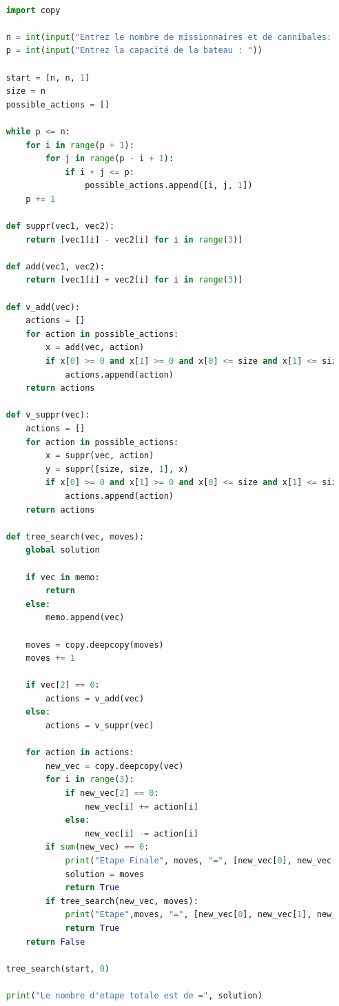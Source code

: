 \documentclass{article}
\begin{document}
\begin{lstlisting}[language=Python, caption=Code Python]

    import copy

    n = int(input("Entrez le nombre de missionnaires et de cannibales: "))
    p = int(input("Entrez la capacité de la bateau : "))

    start = [n, n, 1]
    size = n
    possible_actions = []

    while p <= n:
        for i in range(p + 1):
            for j in range(p - i + 1):
                if i + j <= p:
                    possible_actions.append([i, j, 1])
        p += 1
    
    def suppr(vec1, vec2):
        return [vec1[i] - vec2[i] for i in range(3)]
    
    def add(vec1, vec2):
        return [vec1[i] + vec2[i] for i in range(3)]
    
    def v_add(vec):
        actions = [] 
        for action in possible_actions:
            x = add(vec, action) 
            if x[0] >= 0 and x[1] >= 0 and x[0] <= size and x[1] <= size and (x[0] >= x[1] or x[0] == 0) and (y[0] >= y[1] or y[0] == 0):
                actions.append(action)        
        return actions 
        
    def v_suppr(vec):
        actions = []
        for action in possible_actions:
            x = suppr(vec, action)
            y = suppr([size, size, 1], x)
            if x[0] >= 0 and x[1] >= 0 and x[0] <= size and x[1] <= size and (x[0] >= x[1] or x[0] == 0) and (y[0] >= y[1] or y[0] == 0):
                actions.append(action)
        return actions
    
    def tree_search(vec, moves):
        global solution
    
        if vec in memo:
            return
        else:
            memo.append(vec)
    
        moves = copy.deepcopy(moves)
        moves += 1
    
        if vec[2] == 0: 
            actions = v_add(vec)
        else:
            actions = v_suppr(vec)
    
        for action in actions:
            new_vec = copy.deepcopy(vec)
            for i in range(3):
                if new_vec[2] == 0:
                    new_vec[i] += action[i]
                else:
                    new_vec[i] -= action[i]
            if sum(new_vec) == 0:
                print("Etape Finale", moves, "=", [new_vec[0], new_vec[1], new_vec[2], size-new_vec[0], size-new_vec[1]])
                solution = moves
                return True
            if tree_search(new_vec, moves):
                print("Etape",moves, "=", [new_vec[0], new_vec[1], new_vec[2], size-new_vec[0], size-new_vec[1]])
                return True
        return False
    
    tree_search(start, 0)
    
    print("Le nombre d'etape totale est de =", solution)
    
    
    
    
    
\end{lstlisting}
\end{document}
